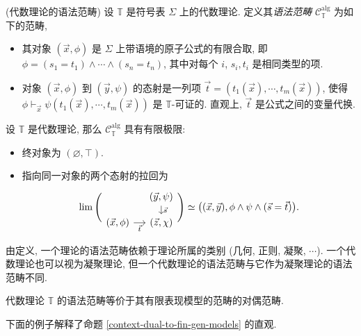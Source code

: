 \begin{definition}
	{(代数理论的语法范畴)}
	设 $\mathbb T$ 是符号表 $\Sigma$ 上的代数理论. 定义其\emph{语法范畴} $\mathcal C_{\mathbb T}^{\text{alg}}$ 为如下的范畴,
	\begin{itemize}
		\item 其对象 $(\vec x,\phi)$ 是 $\Sigma$ 上带语境的原子公式的有限合取, 即 $\phi = (s_1=t_1)\land\cdots\land (s_n=t_n)$, 其中对每个 $i$, $s_i,t_i$ 是相同类型的项.
		\item 对象 $(\vec x , \phi)$ 到 $(\vec y , \psi)$ 的态射是一列项 $\vec t = (t_1(\vec x),\cdots,t_m(\vec x))$, 使得 $\phi\vdash_{\vec x} \psi(t_1(\vec x),\cdots,t_m(\vec x))$ 是 $\mathbb T$-可证的. 直观上, $\vec t$ 是公式之间的变量代换.
	\end{itemize}
\end{definition}

\begin{remark}
	{}
	设 $\mathbb T$ 是代数理论, 那么 $\mathcal C_{\mathbb T}^{\text{alg}}$ 具有有限极限:
	\begin{itemize}
		\item 终对象为 $(\varnothing,\top)$.
		\item 指向同一对象的两个态射的拉回为
		\[
		\lim\Bigg(\begin{tikzcd}[ampersand replacement=\&,sep=small]
			\& {(\vec y,\psi)} \\
			{(\vec x,\phi)} \& {(\vec z,\chi)}
			\arrow["{\vec s}", from=1-2, to=2-2]
			\arrow["{\vec t}"', from=2-1, to=2-2]
		\end{tikzcd}\Bigg)\simeq
		\big((\vec x,\vec y),\phi\land\psi\land (\vec s=\vec t)\big).
		\]
	\end{itemize}
\end{remark}

\begin{remark}
	{}
	由定义, 一个理论的语法范畴依赖于理论所属的类别 (几何, 正则, 凝聚, $\cdots$). 一个代数理论也可以视为凝聚理论, 但一个代数理论的语法范畴与它作为凝聚理论的语法范畴不同.
\end{remark}

\begin{prop}
	[label={context-dual-to-fin-gen-models}]
	{}
	代数理论 $\mathbb T$ 的语法范畴等价于其有限表现模型的范畴的对偶范畴.
\end{prop}

下面的例子解释了命题 \ref{context-dual-to-fin-gen-models} 的直观.

